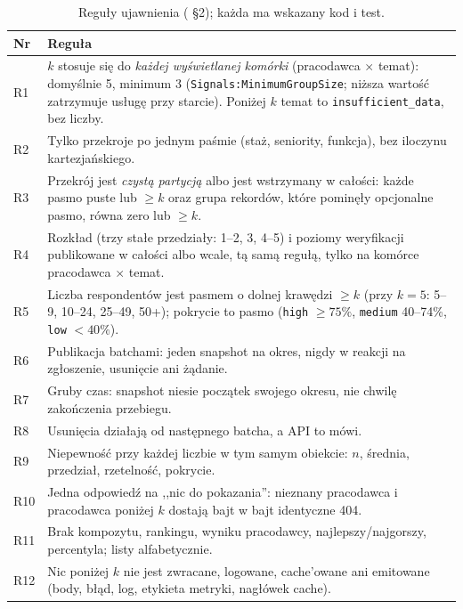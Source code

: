 \begin{table}[htbp]
\centering
\small
\begin{tabularx}{\linewidth}{@{}>{\raggedright\arraybackslash}p{0.9cm}>{\raggedright\arraybackslash}X@{}}
\toprule
\textbf{Nr} & \textbf{Reguła} \\
\midrule
R1 & $k$ stosuje się do \emph{każdej wyświetlanej komórki} (pracodawca $\times$ temat): domyślnie 5, minimum 3 (\texttt{Signals:MinimumGroupSize}; niższa wartość zatrzymuje usługę przy starcie). Poniżej $k$ temat to \texttt{insufficient\_data}, bez liczby. \\
R2 & Tylko przekroje po jednym paśmie (staż, seniority, funkcja), bez iloczynu kartezjańskiego. \\
R3 & Przekrój jest \emph{czystą partycją} albo jest wstrzymany w całości: każde pasmo puste lub $\ge k$ oraz grupa rekordów, które pominęły opcjonalne pasmo, równa zero lub $\ge k$. \\
R4 & Rozkład (trzy stałe przedziały: 1--2, 3, 4--5) i poziomy weryfikacji publikowane w całości albo wcale, tą samą regułą, tylko na komórce pracodawca $\times$ temat. \\
R5 & Liczba respondentów jest pasmem o dolnej krawędzi $\ge k$ (przy $k=5$: 5--9, 10--24, 25--49, 50+); pokrycie to pasmo (\texttt{high} $\ge 75\%$, \texttt{medium} 40--74\%, \texttt{low} $<40\%$). \\
R6 & Publikacja batchami: jeden snapshot na okres, nigdy w reakcji na zgłoszenie, usunięcie ani żądanie. \\
R7 & Gruby czas: snapshot niesie początek swojego okresu, nie chwilę zakończenia przebiegu. \\
R8 & Usunięcia działają od następnego batcha, a API to mówi. \\
R9 & Niepewność przy każdej liczbie w tym samym obiekcie: $n$, średnia, przedział, rzetelność, pokrycie. \\
R10 & Jedna odpowiedź na ,,nic do pokazania'': nieznany pracodawca i pracodawca poniżej $k$ dostają bajt w bajt identyczne 404. \\
R11 & Brak kompozytu, rankingu, wyniku pracodawcy, najlepszy/najgorszy, percentyla; listy alfabetycznie. \\
R12 & Nic poniżej $k$ nie jest zwracane, logowane, cache'owane ani emitowane (body, błąd, log, etykieta metryki, nagłówek cache). \\
\bottomrule
\end{tabularx}
\caption{Reguły ujawnienia ( §2); każda ma wskazany kod i test.}
\label{tab:p3-reguly}
\end{table}

